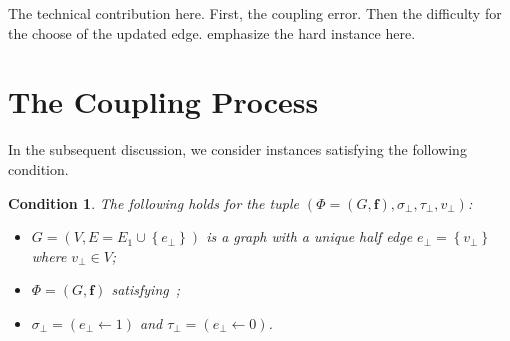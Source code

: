 \documentclass[11pt]{article}
\newtheorem*{remark}{Remark}
\newtheorem{condition}{Condition}
\newcommand{\set}[1]{\left\{#1\right\}}
\newcommand{\vecf}{\boldsymbol{f}}
\newcommand{\qtodo}[1]{\todo[color = purple!40, size = \tiny]{\textbf{guoliang:} #1}}
\begin{document}
The technical contribution here. First, the coupling error. Then the difficulty for the choose of the updated edge. emphasize the hard instance here.

\section{The Coupling Process}



In the subsequent discussion, we consider instances satisfying the following condition.

 
\begin{condition}\label{cond-instancepair}
    The following holds for the tuple $\left(\Phi = (G, \vecf),  \sigma_\bot, \tau_\bot,v_{\bot}\right)$:
    \begin{itemize}
        \item $G = (V, E = E_1 \cup \set{e_\bot})$ is a graph with a unique half edge $e_\bot = \set{v_{\bot}}$ where $v_\bot \in V$;
        \item $\Phi=(G,\vecf)$ satisfying~;
		\item $\sigma_\bot = (e_\bot \gets 1)$ and $\tau_\bot = (e_\bot \gets 0)$.
    \end{itemize}
\end{condition}
    
\end{document}
